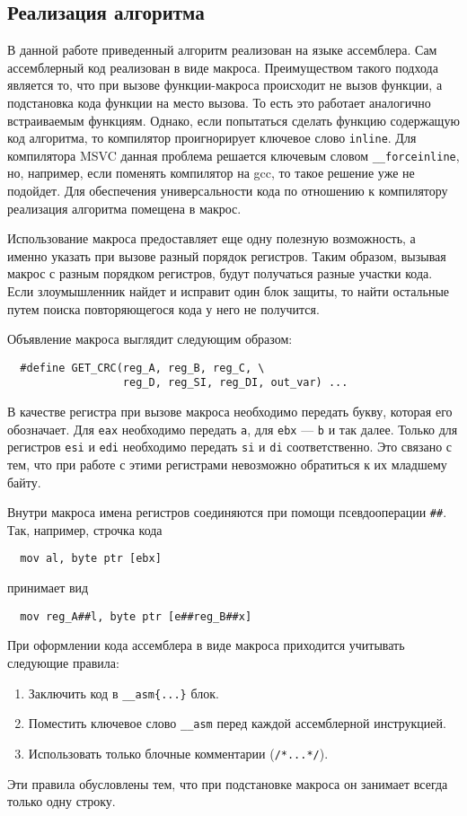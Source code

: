 
\subsection{Реализация алгоритма}

В данной работе приведенный алгоритм реализован на языке ассемблера. Сам
ассемблерный код реализован в виде макроса. Преимуществом такого подхода
является то, что при вызове функции-макроса происходит не вызов функции, а
подстановка кода функции на место вызова. То есть это работает аналогично
встраиваемым функциям. Однако, если попытаться сделать функцию содержащую код
алгоритма, то компилятор проигнорирует ключевое слово \verb!inline!. Для
компилятора MSVC данная проблема решается ключевым словом \verb!__forceinline!,
но, например, если поменять компилятор на gcc, то такое решение уже не подойдет.
Для обеспечения универсальности кода по отношению к компилятору реализация
алгоритма помещена в макрос.

Использование макроса предоставляет еще одну полезную возможность, а именно
указать при вызове разный порядок регистров. Таким образом, вызывая
макрос с разным порядком регистров, будут получаться разные участки кода. Если
злоумышленник найдет и исправит один блок защиты, то найти остальные путем
поиска повторяющегося кода у него не получится.

Объявление макроса выглядит следующим образом:
\begin{verbatim}
  #define GET_CRC(reg_A, reg_B, reg_C, \
                  reg_D, reg_SI, reg_DI, out_var) ...
\end{verbatim}
В качестве регистра при вызове макроса необходимо передать букву, которая его
обозначает. Для \verb!eax! необходимо передать \verb!a!, для \verb!ebx! ---
\verb!b! и так далее. Только для регистров \verb!esi! и \verb!edi! необходимо
передать \verb!si! и \verb!di! соответственно. Это связано с тем, что при работе
с этими регистрами невозможно обратиться к их младшему байту.

Внутри макроса имена регистров соединяются при помощи псевдооперации \verb!##!.
Так, например, строчка кода
\begin{verbatim}
  mov al, byte ptr [ebx]
\end{verbatim}
принимает вид
\begin{verbatim}
  mov reg_A##l, byte ptr [e##reg_B##x]
\end{verbatim}

При оформлении кода ассемблера в виде макроса приходится учитывать следующие
правила:
\begin{enumerate}
  \item Заключить код в \verb!__asm{...}! блок.
  \item Поместить ключевое слово \verb!__asm! перед каждой ассемблерной
    инструкцией.
  \item Использовать только блочные комментарии (\verb!/*...*/!).
\end{enumerate}
Эти правила обусловлены тем, что при подстановке макроса он занимает всегда
только одну строку.

